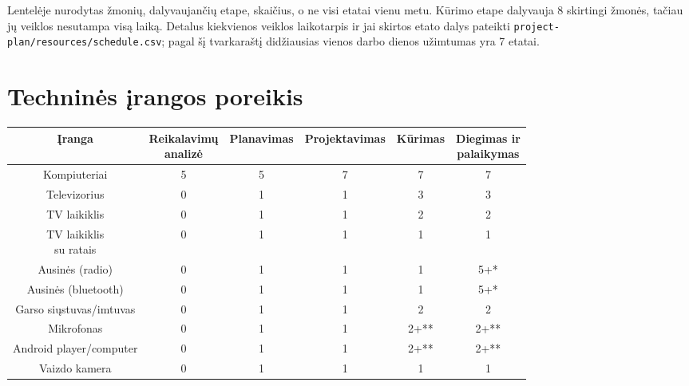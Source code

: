 Lentelėje nurodytas žmonių, dalyvaujančių etape, skaičius, o ne visi etatai
vienu metu. Kūrimo etape dalyvauja 8 skirtingi žmonės, tačiau jų veiklos
nesutampa visą laiką. Detalus kiekvienos veiklos laikotarpis ir jai skirtos
etato dalys pateikti \texttt{project-plan/resources/schedule.csv}; pagal šį
tvarkaraštį didžiausias vienos darbo dienos užimtumas yra 7 etatai.




\newpage
\section{Techninės įrangos poreikis}

\begin{table}[h]
    \centering
    \small
    \begin{tabular}{cccccc}
    \hline
        Įranga  & \makecell{Reikalavimų \\ analizė}  & Planavimas & Projektavimas & Kūrimas & \makecell{Diegimas ir  \\ palaikymas} \\
        \hline
        Kompiuteriai & 5 & 5 & 7 & 7 & 7 \\
    
        Televizorius & 0 & 1 & 1 & 3 & 3 \\
        
        TV laikiklis & 0 & 1 & 1 & 2 & 2 \\
        
        \makecell{TV laikiklis \\ su ratais} & 0 & 1 & 1 & 1 & 1 \\
        
        Ausinės (radio) & 0 & 1 & 1 & 1 & 5+* \\
        
        Ausinės (bluetooth) & 0 & 1 & 1 & 1 & 5+* \\
        
        Garso siųstuvas/imtuvas & 0 & 1 & 1 & 2 & 2 \\
        
        Mikrofonas & 0 & 1 & 1 & 2+** & 2+** \\
        
        
        
        Android player/computer & 0 & 1 & 1 & 2+** & 2+** \\
        
        Vaizdo kamera & 0 & 1 & 1 & 1 & 1 \\
        

\end{tabular}
\end{table}
